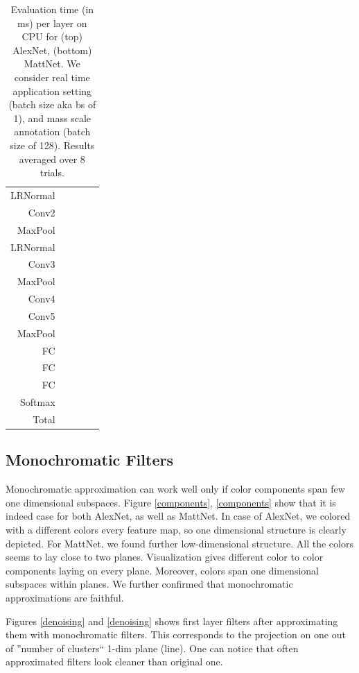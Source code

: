 \begin{table}[t]
{\begin{tabular}{rrrrr}
LRNormal & & & & \\
Conv2 & & & & \\
MaxPool & & & & \\
LRNormal & & & & \\
Conv3 & & & & \\
MaxPool & & & & \\
Conv4 & & & & \\
Conv5 & & & & \\
MaxPool & & & & \\
FC & & & & \\
FC & & & & \\
FC & & & & \\
Softmax & & & & \\
\hline 
Total & & & & \\
\hline
\end{tabular}
}
\caption{Evaluation time (in ms) per layer on CPU for (top) AlexNet, (bottom) MattNet. We consider real time application setting (batch size aka bs of 1), and
mass scale annotation (batch size of 128). Results averaged over 8 trials.}
\label{evaluation_time}
\end{table}



\subsection{Monochromatic Filters}
Monochromatic approximation can work well only if color components span few one dimensional subspaces. 
Figure \ref{components}, \ref{components} show that it is indeed case for both AlexNet, as
well as MattNet. In case of AlexNet, we colored with a different colors every feature map, so one dimensional structure
is clearly depicted. For MattNet, we found further low-dimensional structure. All the colors seems to lay close
to two planes. Visualization gives different color to color components laying on every plane. Moreover,
colors span one dimensional subspaces within planes. We further confirmed that monochromatic approximations
are faithful. 

Figures \ref{denoising} and \ref{denoising} shows first layer filters after approximating them 
with monochromatic filters. This corresponds to the projection on one out of ''number of clusters`` 1-dim plane (line).
One can notice that often approximated filters look cleaner than original one.


